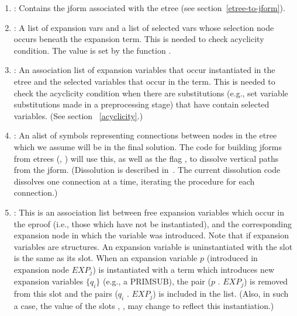 \begin{enumerate}
\item {}:  Contains the jform associated with the etree (see section~\ref{etree-to-jform}).

\item {}: A list of expansion
vars and a list of selected vars whose selection node occurs beneath the expansion term.
This is needed to check acyclicity condition.  The value is set by the function .

\item {}:  An association list of expansion variables that occur instantiated in the etree
and the selected variables that occur in the term.  This is needed to check the acyclicity condition when
there are substitutions (e.g., set variable substitutions made in a preprocessing stage) that have
contain selected variables.  (See section ~\ref{acyclicity}.)

\item {}:  An alist of symbols representing connections between nodes in the etree
which we assume will be in the final solution.  The code for building jforms from etrees (,
) will use this, as well as the flag , to
dissolve vertical paths from the jform.  (Dissolution is described in~\cite{Murray93}.  The current
dissolution code dissolves one connection at a time, iterating the procedure for each connection.)

\item {}:  This is an association list between free expansion variables
which occur in the eproof (i.e., those which have not be instantiated), and the corresponding expansion
node in which the variable was introduced.  Note that if expansion variables are 
structures.  An expansion variable is uninstantiated with the  slot is the same as
its  slot.  When an expansion variable $p$ (introduced in expansion node $EXP_j$)
is instantiated with a term which introduces
new expansion variables $\{q_i\}$ (e.g., a PRIMSUB), the pair ($p$ . $EXP_j$) is removed from this slot
and the pairs ($q_i$ . $EXP_j$) is included in the list.  (Also, in such a case, the value of
the slots , , 
 may change to reflect this instantiation.)


\end{enumerate}
